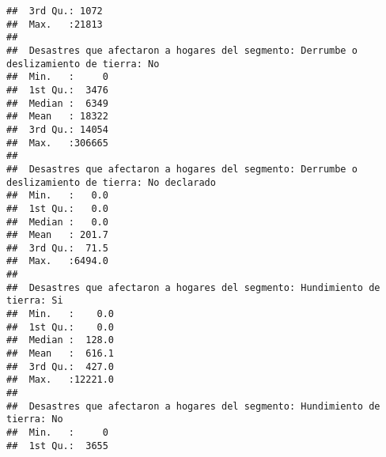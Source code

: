 \documentclass[11pt,]{article}
\begin{document}
\begin{verbatim}
##  3rd Qu.: 1072                                                                         
##  Max.   :21813                                                                         
##                                                                                        
##  Desastres que afectaron a hogares del segmento: Derrumbe o deslizamiento de tierra: No
##  Min.   :     0                                                                        
##  1st Qu.:  3476                                                                        
##  Median :  6349                                                                        
##  Mean   : 18322                                                                        
##  3rd Qu.: 14054                                                                        
##  Max.   :306665                                                                        
##                                                                                        
##  Desastres que afectaron a hogares del segmento: Derrumbe o deslizamiento de tierra: No declarado
##  Min.   :   0.0                                                                                  
##  1st Qu.:   0.0                                                                                  
##  Median :   0.0                                                                                  
##  Mean   : 201.7                                                                                  
##  3rd Qu.:  71.5                                                                                  
##  Max.   :6494.0                                                                                  
##                                                                                                  
##  Desastres que afectaron a hogares del segmento: Hundimiento de tierra: Si
##  Min.   :    0.0                                                          
##  1st Qu.:    0.0                                                          
##  Median :  128.0                                                          
##  Mean   :  616.1                                                          
##  3rd Qu.:  427.0                                                          
##  Max.   :12221.0                                                          
##                                                                           
##  Desastres que afectaron a hogares del segmento: Hundimiento de tierra: No
##  Min.   :     0                                                           
##  1st Qu.:  3655                                                           

\end{verbatim}
\end{document}
